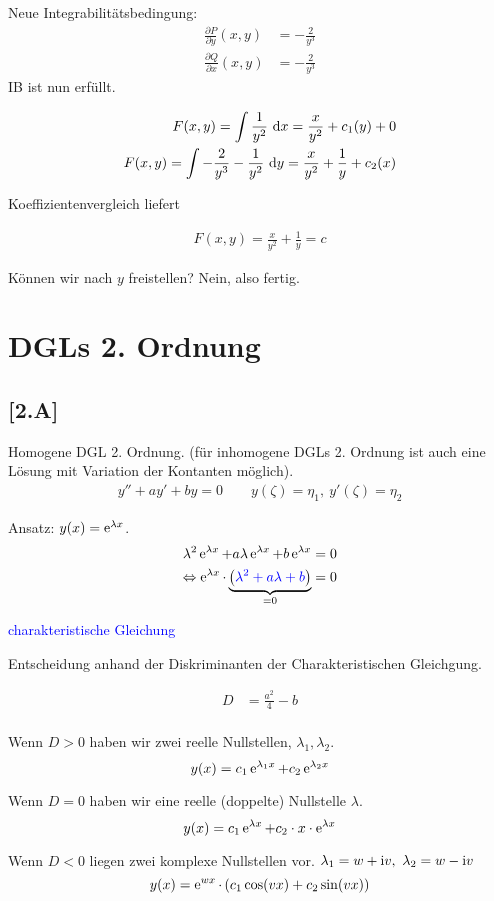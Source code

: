 \documentclass[main.tex]{subfiles}
\begin{document}
Neue Integrabilitätsbedingung:
\begin{align*}
	\frac{\partial P}{\partial y}(x,y) &= - \frac{2}{y^3} \\
	\frac{\partial Q}{\partial x}(x,y) &= - \frac{2}{y^3} 
\end{align*}
IB ist nun erfüllt. 

\begin{align*}
	F(x,y) = \int \frac{1}{y^2} ~\mathrm{d}x = \frac{x}{y^2} + c_1(y) + 0\\
	F(x,y) = \int - \frac{2}{y^3} - \frac{1}{y^2} ~\mathrm{d}y = \frac{x}{y^2} + \frac{1}{y} + c_2(x)
\end{align*}

Koeffizientenvergleich liefert

\begin{align*}
	F(x,y) = \frac{x}{y^2} + \frac{1}{y} = c
\end{align*}

Können wir nach $y$ freistellen? Nein, also fertig. 

\section{DGLs 2. Ordnung}

\subsection*{[2.A]}

Homogene DGL 2. Ordnung. (für inhomogene DGLs 2. Ordnung ist auch eine Lösung mit Variation der Kontanten möglich).
\begin{align*}
	y'' + a y' + by = 0 \qquad y(\zeta) = \eta_1,\ y'(\zeta) = \eta_2
\end{align*}

Ansatz: $y(x) = \operatorname{\mathrm{e}}^{\lambda x}$. 
\begin{align*}
	\lambda^2 \operatorname{\mathrm{e}}^{\lambda x} + a\lambda \operatorname{\mathrm{e}}^{\lambda x} + b\operatorname{\mathrm{e}}^{\lambda x} = 0 \\
	\Leftrightarrow \operatorname{\mathrm{e}}^{\lambda x} \cdot \underbrace{\left( \textcolor{blue}{\lambda^2 +a\lambda + b} \right)}_{= 0} = 0
\end{align*}

\textcolor{blue}{charakteristische Gleichung}

Entscheidung anhand der Diskriminanten der Charakteristischen Gleichgung.

\begin{align}
	D &= \frac{a^2}{4} -b \\
\end{align}

Wenn $D > 0$ haben wir zwei reelle Nullstellen, $\lambda_1, \lambda_2$.
$$
	y(x) = c_1 \operatorname{\mathrm{e}}^{\lambda_1 x} + c_2 \operatorname{\mathrm{e}}^{\lambda_2 x} 
$$

Wenn $D = 0$ haben wir eine reelle (doppelte) Nullstelle $\lambda$.
$$
	y(x) = c_1 \operatorname{\mathrm{e}}^{\lambda x} + c_2 \cdot x \cdot \operatorname{\mathrm{e}}^{\lambda x} 
$$

Wenn $D < 0$ liegen zwei komplexe Nullstellen vor. $\lambda_1 = w + \mathrm{i}v,\ \lambda_2 = w - \mathrm{i}v$
$$
	y(x) = \operatorname{\mathrm{e}}^{w x} \cdot \left( c_1 \cos(v x) + c_2 \sin(v x) \right) 
$$
\end{document}
